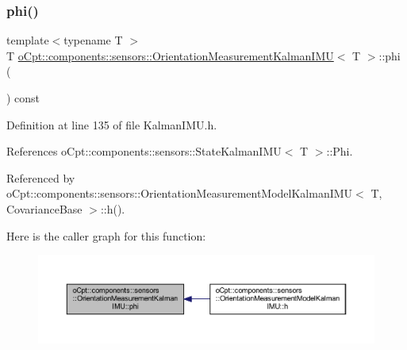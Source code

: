 \subsubsection{\texorpdfstring{phi()}{phi()}\hspace{0.1cm}{\footnotesize\ttfamily [1/2]}}
{\footnotesize\ttfamily template$<$typename T $>$ \\
T \hyperlink{classo_cpt_1_1components_1_1sensors_1_1_orientation_measurement_kalman_i_m_u}{o\+Cpt\+::components\+::sensors\+::\+Orientation\+Measurement\+Kalman\+I\+MU}$<$ T $>$\+::phi (\begin{DoxyParamCaption}{ }\end{DoxyParamCaption}) const\hspace{0.3cm}{\ttfamily [inline]}}



Definition at line 135 of file Kalman\+I\+M\+U.\+h.



References o\+Cpt\+::components\+::sensors\+::\+State\+Kalman\+I\+M\+U$<$ T $>$\+::\+Phi.



Referenced by o\+Cpt\+::components\+::sensors\+::\+Orientation\+Measurement\+Model\+Kalman\+I\+M\+U$<$ T, Covariance\+Base $>$\+::h().

Here is the caller graph for this function\+:
\nopagebreak
\begin{figure}[H]
\begin{center}
\leavevmode
\includegraphics[width=350pt]{classo_cpt_1_1components_1_1sensors_1_1_orientation_measurement_kalman_i_m_u_a0cad53095982781c6631c31ba2282bd7_icgraph}
\end{center}
\end{figure}
\hypertarget{classo_cpt_1_1components_1_1sensors_1_1_orientation_measurement_kalman_i_m_u_a7ff0d891365137bed2f528f6117e8a67}{}\label{classo_cpt_1_1components_1_1sensors_1_1_orientation_measurement_kalman_i_m_u_a7ff0d891365137bed2f528f6117e8a67} 
